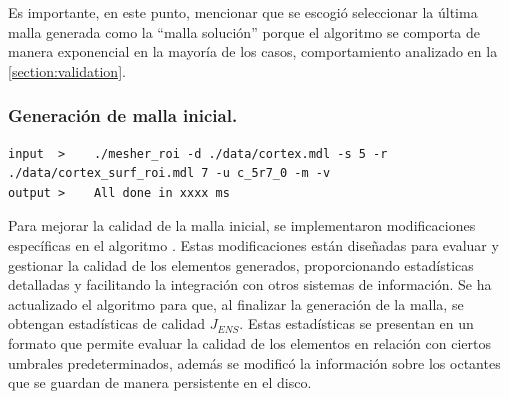 Es importante, en este punto, mencionar que se escogió seleccionar la última malla generada como la ``malla solución'' porque el algoritmo se comporta de manera exponencial en la mayoría de los casos, comportamiento analizado en la \autoref{section:validation}.

\subsubsection{Generación de malla inicial.}


\begin{lstlisting}[style=Console,caption={Generador de malla, crea una malla refinada a nivel 5 y especificamente refina la superficie entregada a nivel 7, se exportará la malla con el nombre \textit{c\_5r7\_0}, en formato vtk y m3d.\\ Fuente: Elaboración propia.}]
input  >    ./mesher_roi -d ./data/cortex.mdl -s 5 -r ./data/cortex_surf_roi.mdl 7 -u c_5r7_0 -m -v
output >    All done in xxxx ms
\end{lstlisting}





Para mejorar la calidad de la malla inicial, se implementaron modificaciones específicas en el algoritmo \mesher{}. Estas modificaciones están diseñadas para evaluar y gestionar la calidad de los elementos generados, proporcionando estadísticas detalladas y facilitando la integración con otros sistemas de información.
Se ha actualizado el algoritmo \mesher{} para que, al finalizar la generación de la malla, se obtengan estadísticas de calidad $J_{ENS}$. Estas estadísticas se presentan en un formato que permite evaluar la calidad de los elementos en relación con ciertos umbrales predeterminados, además se modificó la información sobre los octantes que se guardan de manera persistente en el disco.

